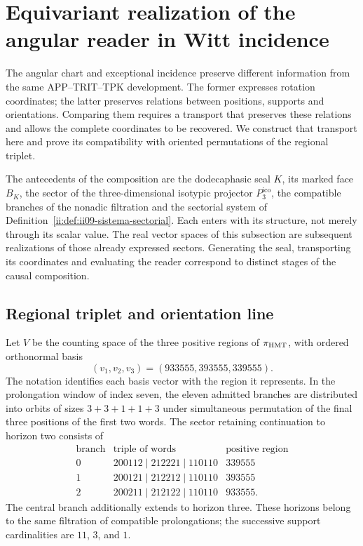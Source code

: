 \section{Equivariant realization of the angular reader in Witt incidence}
\label{ii:sec:ii-enlace-angular-witt}

The angular chart and exceptional incidence preserve different information from the same APP--TRIT--TPK development. The former expresses rotation coordinates; the latter preserves relations between positions, supports and orientations. Comparing them requires a transport that preserves these relations and allows the complete coordinates to be recovered. We construct that transport here and prove its compatibility with oriented permutations of the regional triplet.

The antecedents of the composition are the dodecaphasic seal \(K\), its marked face \(B_K\), the sector of the three-dimensional isotypic projector \(P_3^{\mathrm{ico}}\), the compatible branches of the nonadic filtration and the sectorial system of Definition~\ref{ii:def:ii09-sistema-sectorial}. Each enters with its structure, not merely through its scalar value. The real vector spaces of this subsection are subsequent realizations of those already expressed sectors. Generating the seal, transporting its coordinates and evaluating the reader correspond to distinct stages of the causal composition.

\subsection{Regional triplet and orientation line}

Let \(V\) be the counting space of the three positive regions of
\(\pi_{\rm HMT}\), with ordered orthonormal basis
\[
 (v_1,v_2,v_3)=(933555,393555,339555).
\]
The notation identifies each basis vector with the region it represents.
In the prolongation window of index seven, the eleven admitted branches
are distributed into orbits of sizes \(3+3+1+1+3\) under simultaneous
permutation of the final three positions of the first two words.
The sector retaining continuation to horizon two consists of
\[
\begin{array}{c|c|c}
\text{branch}&\text{triple of words}&\text{positive region}\\ \hline
0&200112\mid212221\mid110110&339555\\
1&200121\mid212212\mid110110&393555\\
2&200211\mid212122\mid110110&933555.
\end{array}
\]
The central branch additionally extends to horizon three. These
horizons belong to the same filtration of compatible prolongations;
the successive support cardinalities are \(11\), \(3\), and \(1\).

